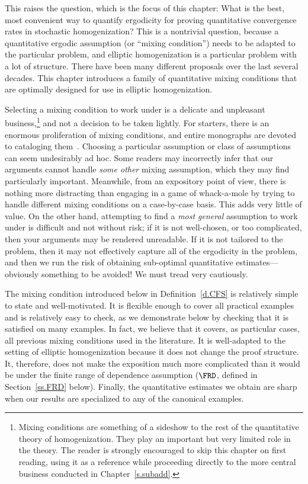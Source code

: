 \documentclass[11pt,twoside]{article} %
\numberwithin{equation}{section}
\theoremstyle{definition}
\begin{document}
\smallskip

This raises the question, which is the focus of this chapter: What is the best, most convenient way to quantify ergodicity for proving quantitative convergence rates in stochastic homogenization? 
This is a nontrivial question, because a quantitative ergodic assumption (or ``mixing condition'')  needs to be adapted to the particular problem, and elliptic homogenization is a particular problem with a lot of structure. 
There have been many different proposals over the last several decades. 
This chapter introduces a family of quantitative mixing conditions that are optimally designed for use in elliptic homogenization.

\smallskip

Selecting a mixing condition to work under is a delicate and unpleasant business,\footnote{Mixing conditions are something of a sideshow to the rest of the quantitative theory of homogenization. They play an important but very limited role in the theory. The reader is strongly encouraged to skip this chapter on first reading, using it as a reference while proceeding directly to the more central business conducted in Chapter~\ref{s.subadd}.} and not a decision to be taken lightly. For starters, there is an enormous proliferation of mixing conditions, and entire monographs are devoted to cataloging them~\cite{Brad,B1,Torq}.
Choosing a particular assumption or class of assumptions can seem  undesirably ad hoc. Some readers may incorrectly infer that our arguments cannot handle \emph{some other} mixing assumption, which they may find particularly important.  Meanwhile, from an expository point of view, there is nothing more distracting  than engaging in a game of whack-a-mole by trying to handle different mixing conditions on a case-by-case basis. This adds very little of value. On the other hand, attempting to find a \emph{most general} assumption to work under is difficult and not without risk; if it is not well-chosen, or too complicated, then your arguments may be rendered unreadable. 
If it is not tailored to the problem, then it may not effectively capture all of the ergodicity in the problem, and then we run the risk of obtaining sub-optimal quantitative estimates---obviously something to be avoided! 
We must tread very cautiously.

\smallskip

The mixing condition introduced below in Definition~\ref{d.CFS} is relatively simple to state and well-motivated. It is flexible enough to cover all practical examples and is relatively easy to check, as we demonstrate below by checking that it is satisfied on many examples. In fact, we believe that it covers, as particular cases, all previous mixing conditions used in the literature. It is well-adapted to the setting of elliptic homogenization because it does not change the proof structure. It, therefore, does not make the exposition much more complicated than it would be under the finite range of dependence assumption ($\FRD$, defined in Section~\ref{ss.FRD} below). Finally, the quantitative estimates we obtain are sharp when our results are specialized to any of the canonical examples. 
\end{document}
